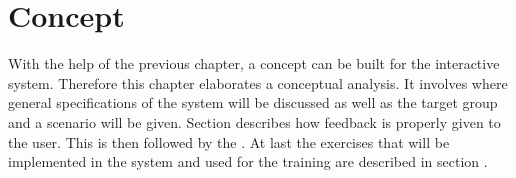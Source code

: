 \chapter{Concept}

With the help of the previous \textbf{} chapter, a concept can be built for the interactive system. Therefore this chapter elaborates a conceptual analysis. It involves \textbf{} where general specifications of the system will be discussed as well as the target group and a scenario will be given. Section \textbf{} describes how feedback is properly given to the user. This is then followed by the \textbf{}. At last the exercises that will be implemented in the system and used for the training are described in section \textbf{}.

